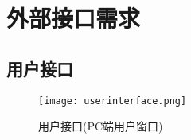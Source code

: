 \section{外部接口需求}
\subsection{用户接口}
\begin{landscape}
\begin{figure}[ht]
	\centering
	\texttt{[image: userinterface.png]}\label{tab:classification}
	\caption{用户接口(PC端用户窗口)}\label{fig:noted-figure}
\end{figure}
\end{landscape}
\newpage
